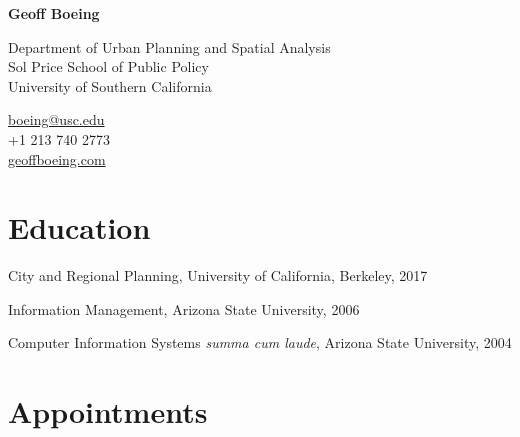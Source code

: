 \documentclass[11pt,letterpaper]{report} %
\newcommand{\myname}{Geoff Boeing}
\newcommand{\namefont}[1]{{\normalfont\bfseries\Huge{#1}}}
\begin{document}
\raggedright{}

\namefont{\myname}

\vspace{1em}
\begin{minipage}[t]{0.700\textwidth}
  Department of Urban Planning and Spatial Analysis \\
  Sol Price School of Public Policy \\
  University of Southern California
\end{minipage}
\begin{minipage}[t]{0.295\textwidth}
  \raggedleft{}
  \href{mailto:boeing@usc.edu}{boeing@usc.edu} \\
  +1 213 740 2773 \\
  \href{https://geoffboeing.com}{geoffboeing.com}
\end{minipage}

\section*{Education}

\begin{tablist}

\item[PhD] \tab{}City and Regional Planning, University of California, Berkeley, 2017
\item[MS]  \tab{}Information Management, Arizona State University, 2006
\item[BS]  \tab{}Computer Information Systems \textit{summa cum laude}, Arizona State University, 2004

\end{tablist}

\section*{Appointments}
\end{document}
